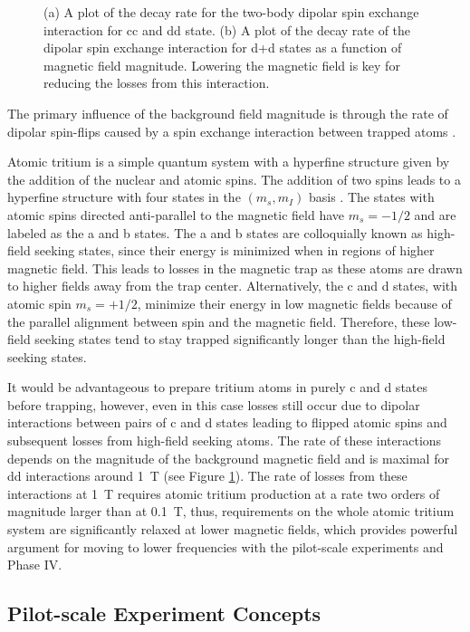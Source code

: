 \begin{figure}[htbp]
\begin{subfigure}{0.49\textwidth}
        \caption{}
    \end{subfigure}
    \caption{(a) A plot of the decay rate for the two-body dipolar spin exchange interaction for cc and dd state. (b) A plot of the decay rate of the dipolar spin exchange interaction for d+d states as a function of magnetic field magnitude. Lowering the magnetic field is key for reducing the losses from this interaction.}
    \label{fig:chap3-dipolarloss}
 \end{figure}
 The primary influence of the background field magnitude is through the rate of dipolar spin-flips caused by a spin exchange interaction between trapped atoms \cite{tritium_spin_exchange}. 
 
 Atomic tritium is a simple quantum system with a hyperfine structure given by the addition of the nuclear and atomic spins. The addition of two spins leads to a hyperfine structure with four states in the $(m_s,m_I)$ basis \cite{tritium_hyperfine}. The states with atomic spins directed anti-parallel to the magnetic field have $m_s=-1/2$ and are labeled as the a and b states. The a and b states are colloquially known as high-field seeking states, since their energy is minimized when in regions of higher magnetic field. This leads to losses in the magnetic trap as these atoms are drawn to higher fields away from the trap center. Alternatively, the c and d states, with atomic spin $m_s=+1/2$, minimize their energy in low magnetic fields because of the parallel alignment between spin and the magnetic field. Therefore, these low-field seeking states tend to stay trapped significantly longer than the high-field seeking states.

It would be advantageous to prepare tritium atoms in purely c and d states before trapping, however, even in this case losses still occur due to dipolar interactions between pairs of c and d states leading to flipped atomic spins and subsequent losses from high-field seeking atoms. The rate of these interactions depends on the magnitude of the background magnetic field and is maximal for dd interactions around 1~T (see Figure \ref{fig:chap3-dipolarloss}). The rate of losses from these interactions at 1~T requires atomic tritium production at a rate two orders of magnitude larger than at 0.1~T, thus, requirements on the whole atomic tritium system are significantly relaxed at lower magnetic fields, which provides powerful argument for moving to lower frequencies with the pilot-scale experiments and Phase IV.

\subsection{Pilot-scale Experiment Concepts}

